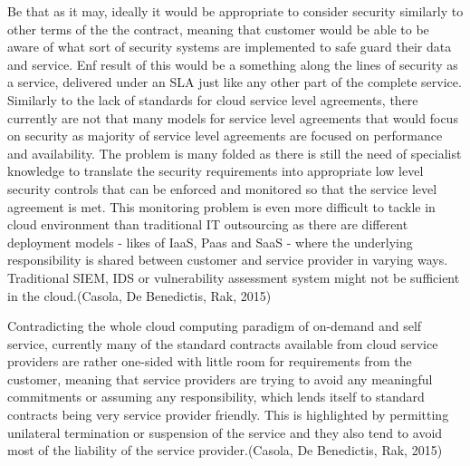 \documentclass{article}
\begin{document}
Be that as it may, ideally it would be appropriate to consider security similarly to other terms of the the contract, meaning that customer would be able to be aware of what sort of security systems are implemented to safe guard their data and service. Enf result of this would be a something along the lines of security as a service, delivered under an SLA just like any other part of the complete service. Similarly to the lack of standards for cloud service level agreements, there currently are not that many models for service level agreements that would focus on security as majority of service level agreements are focused on performance and availability. The problem is many folded as there is still the need of specialist knowledge to translate the security requirements into appropriate low level security controls that can be enforced and monitored so that the service level agreement is met. This monitoring problem is even more difficult to tackle in cloud environment than traditional IT outsourcing as there are different deployment models - likes of IaaS, Paas and SaaS - where the underlying responsibility is shared between customer and service provider in varying ways. Traditional SIEM, IDS or vulnerability assessment system might not be sufficient in the cloud.(Casola, De Benedictis, Rak, 2015)
\par
Contradicting the whole cloud computing paradigm of on-demand and self service, currently many of the standard contracts available from cloud service providers are rather one-sided with little room for requirements from the customer, meaning that service providers are trying to avoid any meaningful commitments or assuming any responsibility, which lends itself to standard contracts being very service provider friendly. This is highlighted by permitting unilateral termination or suspension of the service and they also tend to avoid most of the liability of the service provider.(Casola, De Benedictis, Rak, 2015)
\end{document}
